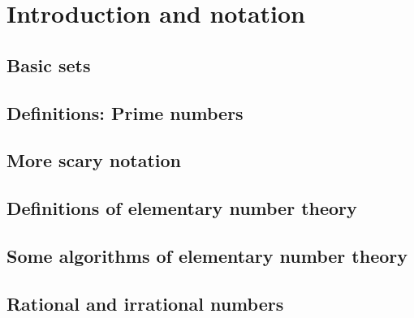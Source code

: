 
\chapter{Introduction and notation}
\label{ch:intro}

\section{Basic sets}
\label{sec:basic}



\newpage

\section{Definitions: Prime numbers}
\label{sec:def}




\newpage

\section{More scary notation}
\label{sec:scary}




\newpage


\section{Definitions of elementary number theory}
\label{sec:num_thry}




\newpage

\section[Some algorithms]{Some algorithms of elementary number theory}
\label{sec:alg}




\newpage

\section{Rational and irrational numbers}
\label{sec:rat}

